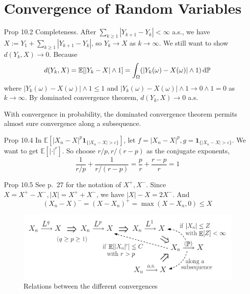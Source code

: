 \setcounter{section}{9}
\section{Convergence of Random Variables}

\begin{note}{Prop 10.2}
    Completeness. After $\sum_{k\ge 1}|Y_{k+1}-Y_k|<\infty$ a.s., we have $X:=Y_1+\sum_{k\ge 1}|Y_{k+1}-Y_k|$, so $Y_k\to X$ as $k\to\infty$. We still want to show $d(Y_k,X)\to 0$. Because 
    \[
    d(Y_k,X)=\mathbb{E}[|Y_k-X|\land 1]=\int_{\Omega}(|Y_k(\omega)-X(\omega)|\land 1)\mathop{}\!\mathrm{d}\mathbb{P}
    \]
    where $|Y_k(\omega)-X(\omega)|\land 1\le 1$ and $|Y_k(\omega)-X(\omega)|\land 1\to 0\land 1=0$ as $k\to\infty$. By dominated convergence theorem, $d(Y_k,X)\to 0$ a.s.
    \begin{remark}
        With convergence in probability, the dominated convergence theorem permits almost sure convergence along a subsequence.
    \end{remark}
\end{note}

\begin{note}{Prop 10.4}
    In $\mathbb{E}[|X_n-X|^p\mathbf{1}_{\{|X_n-X|>\varepsilon\}}]$, let $f=|X_n-X|^p,g=\mathbf{1}_{\{|X_n-X|>\varepsilon\}}$. We want to get $\mathbb{E}[|\cdot|^r]$. So choose $r/p, r/(r-p)$ as the conjugate exponents,
    \[
    \frac{1}{r/p}+\frac{1}{r/(r-p)}=\frac{p}{r}+\frac{r-p}{r}=1
    \]
\end{note}

\begin{note}{Prop 10.5}
    See p.~27 for the notation of $X^+,X^-$. Since $X=X^+-X^-,|X|=X^++X^-$, we have $|X|-X=2X^-$. And 
    \[
    (X_n-X)^-=(X-X_n)^+=\max(X-X_n,0)\le X
    \]
\end{note}

\begin{figure}[H]
    \centering
    \includegraphics[width=0.65\linewidth]{fig/Fig10-1.png}
    \caption{Relations between the different convergences}
\end{figure}

